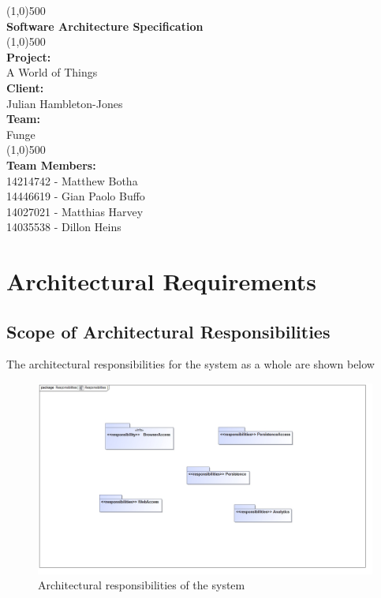 \documentclass{article}
\begin{document}
\begin{titlepage}
	\begin{center}
		\line(1,0){500}\\
		[6mm]
		\huge{\bfseries Software Architecture Specification}\\
		\line(1,0){500}\\
		[5mm]
		\large\textbf{Project:}\\A World of Things\\
		[3mm]
		\large\textbf{Client:}\\Julian Hambleton-Jones\\
		[3mm]
		\large \textbf{Team:}\\Funge\\
		\line(1,0){500}\\
		[5mm]
		\large \textbf{Team Members:}\\
		[3mm]
		\large 14214742 - Matthew Botha\\
		\large 14446619 - Gian Paolo Buffo\\
		\large 14027021 - Matthias Harvey\\
        \large 14035538 - Dillon Heins\\[3mm]
	\end{center}
\end{titlepage}

\cleardoublepage
\thispagestyle{empty}
\tableofcontents

\cleardoublepage
\setcounter{page}{1}

\section{Architectural Requirements}
\subsection{Scope of Architectural Responsibilities}
The architectural responsibilities for the system as a whole are shown below
\begin{figure}[H]
	\centering
	\includegraphics[width=\textwidth]{Responsibilities.jpg}
	\caption{Architectural responsibilities of the system}
\end{figure}
\end{document}
